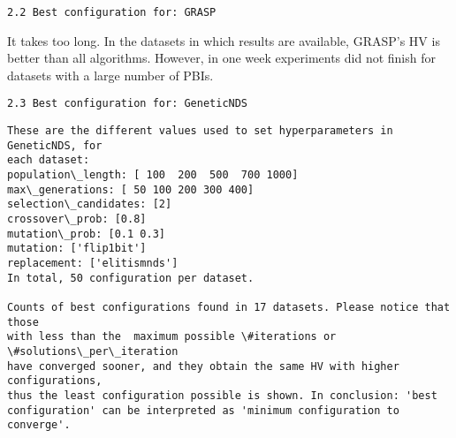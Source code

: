 \documentclass[11pt]{article}
\begin{document}
    \begin{verbatim}
2.2 Best configuration for: GRASP
\end{verbatim}

It takes too long. In the datasets in which results are available,
GRASP's HV is better than all algorithms. However, in one week
experiments did not finish for datasets with a large number of PBIs.

    

    \begin{verbatim}
2.3 Best configuration for: GeneticNDS
\end{verbatim}

    \begin{Verbatim}[commandchars=\\\{\}]
These are the different values used to set hyperparameters in GeneticNDS, for
each dataset:
population\_length: [ 100  200  500  700 1000]
max\_generations: [ 50 100 200 300 400]
selection\_candidates: [2]
crossover\_prob: [0.8]
mutation\_prob: [0.1 0.3]
mutation: ['flip1bit']
replacement: ['elitismnds']
In total, 50 configuration per dataset.

Counts of best configurations found in 17 datasets. Please notice that those
with less than the  maximum possible \#iterations or \#solutions\_per\_iteration
have converged sooner, and they obtain the same HV with higher configurations,
thus the least configuration possible is shown. In conclusion: 'best
configuration' can be interpreted as 'minimum configuration to converge'.
    \end{Verbatim}
\end{document}
